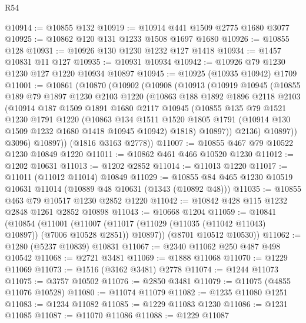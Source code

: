 \begin{lexlean}{R54}
\begin{coremodule}
@10914 := @10855 @132
@10919 := @10914 @441 @1509 @2775 @1680 @3077
@10925 := @10862 @120 @131 @1233 @1508 @1697 @1680
@10926 := @10855 @128
@10931 := @10926 @130 @1230 @1232 @127 @1418
@10934 := @1457 @10831 @11 @127
@10935 := @10931 @10934
@10942 := @10926 @79 @1230 @1230 @127 @1220 @10934 @10897
@10945 := @10925 (@10935 @10942) @1709
@11001 := @10861
    (@10870
      (@10902
        (@10908
          (@10913
            (@10919
              @10945
              (@10855
                @189
                @79
                @1897
                @1230
                @2103
                @1220
                (@10863
                  @188
                  @1892
                  @1896
                  @2118
                  @2103
                  (@10914
                    @187
                    @1509
                    @1891
                    @1680
                    @2117
                    @10945
                    (@10855
                      @135
                      @79
                      @1521
                      @1230
                      @1791
                      @1220
                      (@10863
                        @134
                        @1511
                        @1520
                        @1805
                        @1791
                        (@10914 @130 @1509 @1232 @1680 @1418 @10945 @10942)
                        @1818)
                      @10897))
                  @2136)
                @10897))
            @3096)
          @10897))
      (@1816 @3163 @2778))
@11007 := @10855 @467 @79 @10522 @1230 @10849 @1220
@11011 := @10862 @461 @466 @10520 @1230
@11012 := @1202 @10631
@11013 := @1202 @2852
@11014 := @11013 @1220
@11017 := @11011 (@11012 @11014) @10849
@11029 := @10855 @84 @465 @1230 @10519 @10631 @11014 (@10889 @48 @10631 (@1343 (@10892 @48)))
@11035 := @10855 @463 @79 @10517 @1230 @2852 @1220
@11042 := @10842 @428 @115 @1232 @2848 @1261 @2852 @10898
@11043 := @10668 @1204
@11059 := @10841
    (@10854
      (@11001
        (@11007 (@11017 (@11029 (@11035 (@11042 @11043) @10897)) (@7006 @10528 @2851)) @10897))
      (@8701 @10512 @10530))
@11062 := @1280 (@5237 @10839) @10831
@11067 := @2340 @11062 @250 @487 @498 @10542
@11068 := @2721 @3481
@11069 := @1888 @11068
@11070 := @1229 @11069
@11073 := @1516 (@3162 @3481) @2778
@11074 := @1244 @11073
@11075 := @3757 @10502
@11076 := @2850 @3481
@11079 := @11075 (@4855 @11076 @10528)
@11080 := @11074 @11079
@11082 := @1235 @11080 @1251
@11083 := @1234 @11082
@11085 := @1229 @11083 @1230
@11086 := @1231 @11085
@11087 := @11070 @11086
@11088 := @1229 @11087

\end{coremodule}
\end{lexlean}
